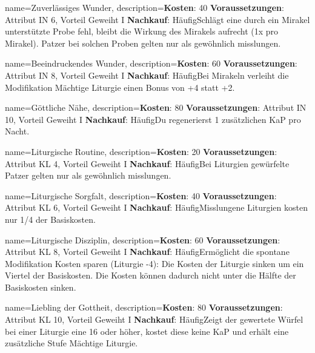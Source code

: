 {
    name={Zuverlässiges Wunder},
    description={\textbf{Kosten}: 40 \textbf{Voraussetzungen}: Attribut IN 6, Vorteil Geweiht I \textbf{Nachkauf}: Häufig\newline Schlägt eine durch ein Mirakel unterstützte Probe fehl, bleibt die Wirkung des Mirakels aufrecht (1x pro Mirakel). Patzer bei solchen Proben gelten nur als gewöhnlich misslungen.}
}


{
    name={Beeindruckendes Wunder},
    description={\textbf{Kosten}: 60 \textbf{Voraussetzungen}: Attribut IN 8, Vorteil Geweiht I \textbf{Nachkauf}: Häufig\newline Bei Mirakeln verleiht die Modifikation Mächtige Liturgie einen Bonus von +4 statt +2.}
}


{
    name={Göttliche Nähe},
    description={\textbf{Kosten}: 80 \textbf{Voraussetzungen}: Attribut IN 10, Vorteil Geweiht I \textbf{Nachkauf}: Häufig\newline Du regenerierst 1 zusätzlichen KaP pro Nacht.}
}


{
    name={Liturgische Routine},
    description={\textbf{Kosten}: 20 \textbf{Voraussetzungen}: Attribut KL 4, Vorteil Geweiht I \textbf{Nachkauf}: Häufig\newline Bei Liturgien gewürfelte Patzer gelten nur als gewöhnlich misslungen.}
}


{
    name={Liturgische Sorgfalt},
    description={\textbf{Kosten}: 40 \textbf{Voraussetzungen}: Attribut KL 6, Vorteil Geweiht I \textbf{Nachkauf}: Häufig\newline Misslungene Liturgien kosten nur 1/4 der Basiskosten.}
}


{
    name={Liturgische Disziplin},
    description={\textbf{Kosten}: 60 \textbf{Voraussetzungen}: Attribut KL 8, Vorteil Geweiht I \textbf{Nachkauf}: Häufig\newline Ermöglicht die spontane Modifikation Kosten sparen (Liturgie -4): Die Kosten der Liturgie sinken um ein Viertel der Basiskosten. Die Kosten können dadurch nicht unter die Hälfte der Basiskosten sinken.}
}


{
    name={Liebling der Gottheit},
    description={\textbf{Kosten}: 80 \textbf{Voraussetzungen}: Attribut KL 10, Vorteil Geweiht I \textbf{Nachkauf}: Häufig\newline Zeigt der gewertete Würfel bei einer Liturgie eine 16 oder höher, kostet diese keine KaP und erhält eine zusätzliche Stufe Mächtige Liturgie.}
}


